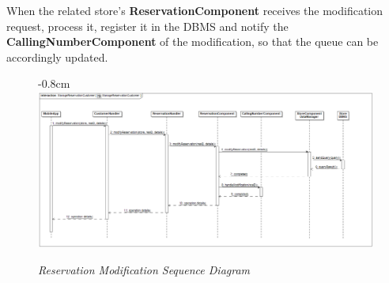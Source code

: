 \documentclass{article}
\begin{document}
	When the related store's {\bfseries ReservationComponent} receives the modification request, process it, register it in the DBMS and notify the {\bfseries CallingNumberComponent} of the modification, so that the queue can be accordingly updated.
	\begin{figure}[H]
		\begin{adjustwidth} {-0.8cm}{}
			\centering
			\includegraphics[scale=0.3]{Sequence Diagrams/sd__ManageReservationCustomer__ManageReservationCustomer.png}
		\end{adjustwidth}
		\caption{\emph{Reservation Modification Sequence Diagram}}
	\end{figure}
\end{document}
